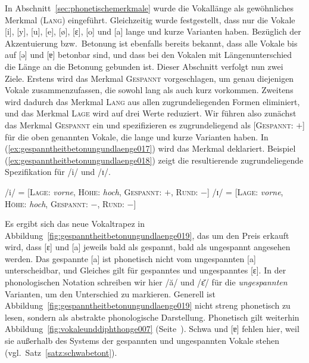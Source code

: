 In Abschnitt~\ref{sec:phonetischemerkmale} wurde die Vokallänge als gewöhnliches Merkmal (\textsc{Lang}) eingeführt.
Gleichzeitig wurde festgestellt, dass nur die Vokale [i], [y], [u], [e], [ø], [ɛ], [o] und [a] lange und kurze Varianten haben.
Bezüglich der Akzentuierung bzw.\ Betonung ist ebenfalls bereits bekannt, dass alle Vokale bis auf [ə] und [ɐ] betonbar sind, und dass bei den Vokalen mit Längenunterschied die Länge an die Betonung gebunden ist.
Dieser Abschnitt verfolgt nun zwei Ziele.
Erstens wird das Merkmal \textsc{Gespannt} vorgeschlagen, um genau diejenigen Vokale zusammenzufassen, die sowohl lang als auch kurz vorkommen.
Zweitens wird dadurch das Merkmal \textsc{Lang} aus allen zugrundeliegenden Formen eliminiert, und das Merkmal \textsc{Lage} wird auf drei Werte reduziert.
Wir führen also zunächst das Merkmal \textsc{Gespannt} ein und spezifizieren es zugrundeliegend als [\textsc{Gespannt}: $+$] für die oben genannten Vokale, die lange und kurze Varianten haben.
In (\ref{ex:gespanntheitbetonungundlaenge017}) wird das Merkmal deklariert.
Beispiel (\ref{ex:gespanntheitbetonungundlaenge018}) zeigt die resultierende zugrundeliegende Spezifikation für /i/ und /ɪ/.

\begin{exe}
  \ex\label{ex:gespanntheitbetonungundlaenge018}
  \begin{xlist}
    \ex /i/ = [\textsc{Lage}: \textit{vorne}, \textsc{Höhe}: \textit{hoch}, \textsc{Gespannt}: $+$, \textsc{Rund}: $-$]
    \ex /ɪ/ = [\textsc{Lage}: \textit{vorne}, \textsc{Höhe}: \textit{hoch}, \textsc{Gespannt}: $-$, \textsc{Rund}: $-$]
  \end{xlist}
\end{exe}

Es ergibt sich das neue Vokaltrapez in Abbildung~\ref{fig:gespanntheitbetonungundlaenge019}, das um den Preis erkauft wird, dass [ɛ] und [a] jeweils bald als gespannt, bald als ungespannt angesehen werden.
Das gespannte [a] ist phonetisch nicht vom ungespannten [a] unterscheidbar, und Gleiches gilt für gespanntes und ungespanntes [ɛ].
In der phonologischen Notation schreiben wir hier /ă/ und /ɛ̆/ für die \textit{ungespannten} Varianten, um den Unterschied zu markieren.
Generell ist Abbildung~\ref{fig:gespanntheitbetonungundlaenge019} nicht streng phonetisch zu lesen, sondern als abstrakte phonologische Darstellung.
Phonetisch gilt weiterhin Abbildung~\ref{fig:vokaleunddiphthonge007} (Seite~\pageref{fig:vokaleunddiphthonge007}).
Schwa und [ɐ] fehlen hier, weil sie außerhalb des Systems der gespannten und ungespannten Vokale stehen (vgl.\ Satz~\ref{satz:schwabetont}).

